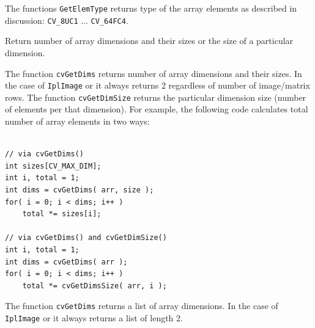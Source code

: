 \begin{description}
\end{description}


The functions \texttt{GetElemType} returns type of the array elements
as described in  discussion: \texttt{CV\_8UC1}
... \texttt{CV\_64FC4}.


\label{GetDims, GetDimSize}

Return number of array dimensions and their sizes or the size of a particular dimension.

\ifC
{}

\begin{description}
\end{description}


The function \texttt{cvGetDims} returns number of array dimensions and
their sizes. In the case of \texttt{IplImage} or  it always
returns 2 regardless of number of image/matrix rows. The function
\texttt{cvGetDimSize} returns the particular dimension size (number of
elements per that dimension). For example, the following code calculates
total number of array elements in two ways:

\begin{lstlisting}

// via cvGetDims()
int sizes[CV_MAX_DIM];
int i, total = 1;
int dims = cvGetDims( arr, size );
for( i = 0; i < dims; i++ )
    total *= sizes[i];

// via cvGetDims() and cvGetDimSize()
int i, total = 1;
int dims = cvGetDims( arr );
for( i = 0; i < dims; i++ )
    total *= cvGetDimsSize( arr, i );

\end{lstlisting}
\else
{}

\begin{description}
\end{description}


The function \texttt{cvGetDims} returns a list of array dimensions.
In the case of \texttt{IplImage} or  it always
returns a list of length 2.
\fi

